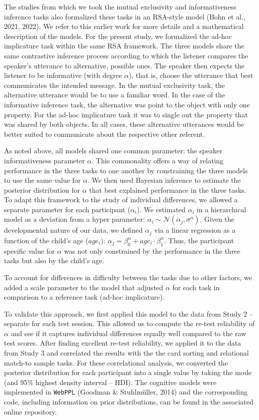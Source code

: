 \documentclass[
  english,
  man,floatsintext]{apa6}
\begin{document}
The studies from which we took the mutual exclusivity and informativeness inference tasks also formalized these tasks in an RSA-style model (Bohn et al., 2021, 2022). We refer to this earlier work for more details and a mathematical description of the models. For the present study, we formalized the ad-hoc implicature task within the same RSA framework. The three models share the same contrastive inference process according to which the listener compares the speaker's utterance to alternative, possible ones. The speaker then expects the listener to be informative (with degree \(\alpha\)), that is, choose the utterance that best communicates the intended message. In the mutual exclusivity task, the alternative utterance would be to use a familiar word. In the case of the informative inference task, the alternative was point to the object with only one property. For the ad-hoc implicature task it was to single out the property that was shared by both objects. In all cases, these alternative utterances would be better suited to communicate about the respective other referent.

As noted above, all models shared one common parameter: the speaker informativeness parameter \(\alpha\). This commonality offers a way of relating performance in the three tasks to one another by constraining the three models to use the same value for \(\alpha\). We then used Bayesian inference to estimate the posterior distribution for \(\alpha\) that best explained performance in the three tasks. To adapt this framework to the study of individual differences, we allowed a separate parameter for each participant (\(\alpha_i\)). We estimated \(\alpha_i\) in a hierarchical model as a deviation from a hyper parameter: \(\alpha_i \sim \mathcal{N}(\alpha_j, \sigma^\alpha)\). Given the developmental nature of our data, we defined \(\alpha_j\) via a linear regression as a function of the child's age (\(age_i\)): \(\alpha_j = \beta^\alpha_0 + age_i \cdot \beta^\alpha_1\). Thus, the participant specific value for \(\alpha\) was not only constrained by the performance in the three tasks but also by the child's age.

To account for differences in difficulty between the tasks due to other factors, we added a scale parameter to the model that adjusted \(\alpha\) for each task in comparison to a reference task (ad-hoc implicature).

To validate this approach, we first applied this model to the data from Study 2 -- separate for each test session. This allowed us to compute the re-test reliability of \(\alpha\) and see if it captures individual differences equally well compared to the raw test scores. After finding excellent re-test reliability, we applied it to the data from Study 3 and correlated the results with the the card sorting and relational match-to sample tasks. For these correlational analysis, we converted the posterior distribution for each participant into a single value by taking the mode (and 95\% highest density interval -- HDI). The cognitive models were implemented in \texttt{WebPPL} (Goodman \& Stuhlmüller, 2014) and the corresponding code, including information on prior distributions, can be found in the associated online repository.
\end{document}
